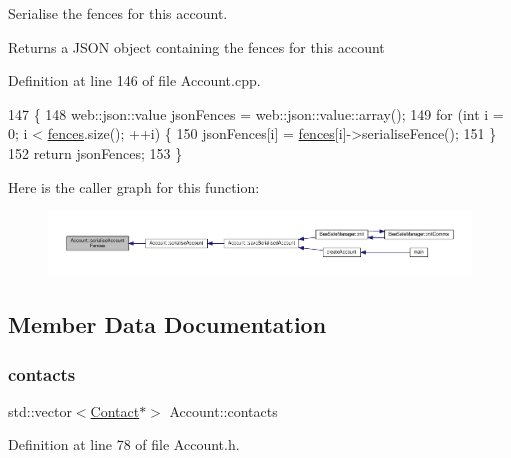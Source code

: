 Serialise the fences for this account.

\begin{DoxyReturn}{Returns}
a J\+S\+ON object containing the fences for this account 
\end{DoxyReturn}


Definition at line 146 of file Account.\+cpp.


\begin{DoxyCode}
147 \{
148     web::json::value jsonFences = web::json::value::array();
149     \textcolor{keywordflow}{for} (\textcolor{keywordtype}{int} i = 0; i < \hyperlink{class_account_ad92a9e8008371f34da06cd416a716fa1}{fences}.size(); ++i) \{
150         jsonFences[i] = \hyperlink{class_account_ad92a9e8008371f34da06cd416a716fa1}{fences}[i]->serialiseFence();
151     \}
152     \textcolor{keywordflow}{return} jsonFences;
153 \}
\end{DoxyCode}
Here is the caller graph for this function\+:\nopagebreak
\begin{figure}[H]
\begin{center}
\leavevmode
\includegraphics[width=350pt]{db/d22/class_account_a426837a406852a6e6b11eda85828fc58_icgraph}
\end{center}
\end{figure}


\subsection{Member Data Documentation}
\mbox{\label{class_account_aa4f77abd7c44f2a70b0cff8088e3491f}} 
\subsubsection{\texorpdfstring{contacts}{contacts}}
{\footnotesize\ttfamily std\+::vector$<$\hyperlink{class_contact}{Contact}$\ast$$>$ Account\+::contacts\hspace{0.3cm}{\ttfamily [private]}}



Definition at line 78 of file Account.\+h.

\mbox{\label{class_account_ad92a9e8008371f34da06cd416a716fa1}} 
